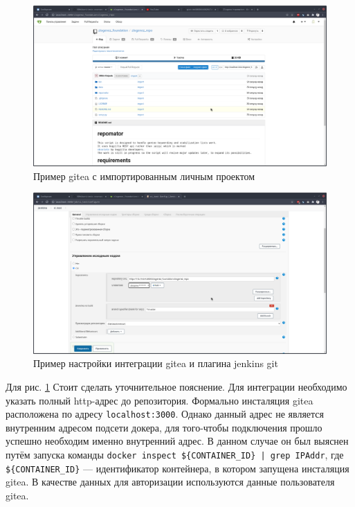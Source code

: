 \documentclass[a4paper]{extarticle}
\begin{document}
\begin{figure}[H]
\includegraphics[width=\textwidth,height=\textheight,keepaspectratio]{gitea_import.png}
\caption{Пример gitea с импортированным личным проектом}
\end{figure}

\begin{figure}[H]
\includegraphics[width=\textwidth,height=\textheight,keepaspectratio]{jenkins_git.png}
\caption{Пример настройки интеграции gitea и плагина jenkins git}
\label{fig:git}
\end{figure}

Для рис. \ref{fig:git} Стоит сделать уточнительное пояснение. Для интеграции необходимо указать полный http-адрес до репозитория. Формально инсталяция gitea расположена по адресу \texttt{localhost:3000}. Однако данный адрес не является внутренним адресом подсети докера, для того-чтобы подключения прошло успешно необходим именно внутренний адрес. В данном случае он был выяснен путём запуска команды
\verb#docker inspect ${CONTAINER_ID} | grep IPAddr#, где \verb#${CONTAINER_ID}# --- идентификатор контейнера, в котором запущена инсталяция gitea. В качестве данных  для авторизации используются данные пользователя gitea.
\end{document}
